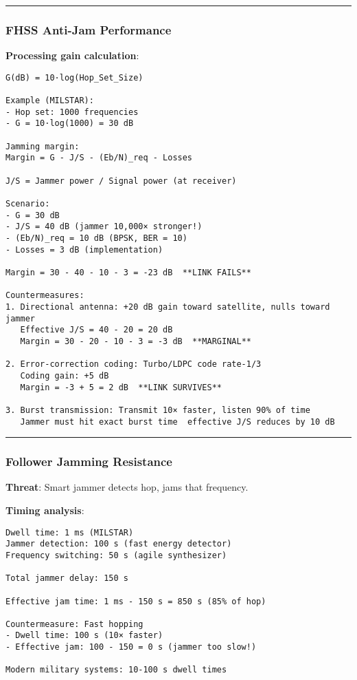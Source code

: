 \begin{center}\rule{0.5\linewidth}{0.5pt}\end{center}

\subsubsection{FHSS Anti-Jam
Performance}\label{fhss-anti-jam-performance}

\textbf{Processing gain calculation}:

\begin{verbatim}
G(dB) = 10·log(Hop_Set_Size)

Example (MILSTAR):
- Hop set: 1000 frequencies
- G = 10·log(1000) = 30 dB

Jamming margin:
Margin = G - J/S - (Eb/N)_req - Losses

J/S = Jammer power / Signal power (at receiver)

Scenario:
- G = 30 dB
- J/S = 40 dB (jammer 10,000× stronger!)
- (Eb/N)_req = 10 dB (BPSK, BER = 10)
- Losses = 3 dB (implementation)

Margin = 30 - 40 - 10 - 3 = -23 dB  **LINK FAILS**

Countermeasures:
1. Directional antenna: +20 dB gain toward satellite, nulls toward jammer
   Effective J/S = 40 - 20 = 20 dB
   Margin = 30 - 20 - 10 - 3 = -3 dB  **MARGINAL**

2. Error-correction coding: Turbo/LDPC code rate-1/3
   Coding gain: +5 dB
   Margin = -3 + 5 = 2 dB  **LINK SURVIVES**

3. Burst transmission: Transmit 10× faster, listen 90% of time
   Jammer must hit exact burst time  effective J/S reduces by 10 dB
\end{verbatim}

\begin{center}\rule{0.5\linewidth}{0.5pt}\end{center}

\subsubsection{Follower Jamming
Resistance}\label{follower-jamming-resistance}

\textbf{Threat}: Smart jammer detects hop, jams that frequency.

\textbf{Timing analysis}:

\begin{verbatim}
Dwell time: 1 ms (MILSTAR)
Jammer detection: 100 s (fast energy detector)
Frequency switching: 50 s (agile synthesizer)

Total jammer delay: 150 s

Effective jam time: 1 ms - 150 s = 850 s (85% of hop)

Countermeasure: Fast hopping
- Dwell time: 100 s (10× faster)
- Effective jam: 100 - 150 = 0 s (jammer too slow!)

Modern military systems: 10-100 s dwell times
\end{verbatim}

